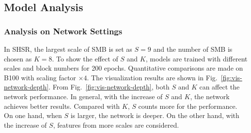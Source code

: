 \documentclass[manuscript,screen]{acmart}
\begin{document}
\subsection{Model Analysis}
\subsubsection{Analysis on Network Settings}
In SHSR, the largest scale of SMB is set as $S=9$ and the number of SMB is chosen as $K=8$. To show the effect of $S$ and $K$, models are trained with different scales and block numbers for 200 epochs. Quantitative comparisons are made on B100 with scaling factor $\times4$. The visualization results are shown in Fig.~\ref{fig:vis-network-depth}. From Fig.~\ref{fig:vis-network-depth}, both $S$ and $K$ can affect the network performance. In general, with the increase of $S$ and $K$, the network achieves better results. Compared with $K$, $S$ counts more for the performance. On one hand, when $S$ is larger, the network is deeper. On the other hand, with the increase of $S$, features from more scales are considered.
\end{document}
